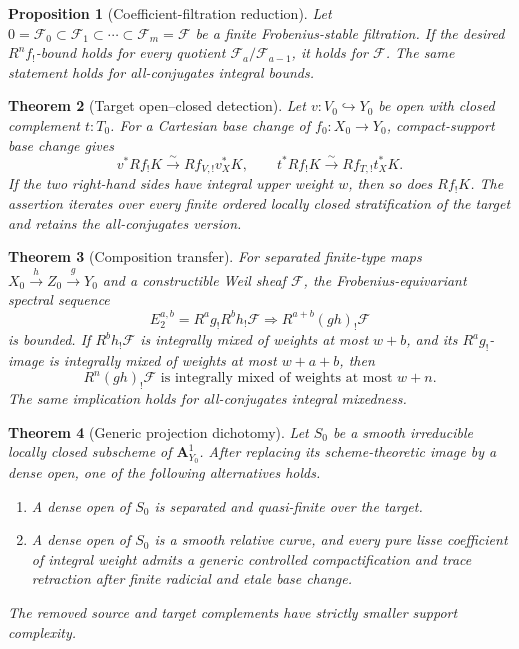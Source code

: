 \documentclass[10pt]{article}
\newtheorem{theorem}{Theorem}[section]
\newtheorem{proposition}[theorem]{Proposition}
\theoremstyle{definition}
\begin{document}
\begin{proposition}[Coefficient-filtration reduction]
Let
\(0=\mathcal F_0\subset\mathcal F_1\subset\cdots\subset
\mathcal F_m=\mathcal F\) be a finite Frobenius-stable filtration.  If the
desired \(R^nf_!\)-bound holds for every quotient
\(\mathcal F_a/\mathcal F_{a-1}\), it holds for \(\mathcal F\).  The same
statement holds for all-conjugates integral bounds.
\end{proposition}

\begin{theorem}[Target open--closed detection]
Let \(v:V_0\hookrightarrow Y_0\) be open with closed complement \(t:T_0\).
For a Cartesian base change of \(f_0:X_0\to Y_0\), compact-support base
change gives
\[
 v^*Rf_!K\xrightarrow{\sim}Rf_{V,!}v_X^*K,
 \qquad
 t^*Rf_!K\xrightarrow{\sim}Rf_{T,!}t_X^*K.
\]
If the two right-hand sides have integral upper weight \(w\), then so does
\(Rf_!K\).  The assertion iterates over every finite ordered locally closed
stratification of the target and retains the all-conjugates version.
\end{theorem}

\begin{theorem}[Composition transfer]
For separated finite-type maps
\(X_0\xrightarrow{h} Z_0\xrightarrow{g}Y_0\) and a constructible Weil sheaf
\(\mathcal F\), the Frobenius-equivariant spectral sequence
\[
 E_2^{a,b}=R^ag_!R^bh_!\mathcal F
          \Longrightarrow R^{a+b}(gh)_!\mathcal F
\]
is bounded.  If \(R^bh_!\mathcal F\) is integrally mixed of weights at most
\(w+b\), and its \(R^ag_!\)-image is integrally mixed of weights at most
\(w+a+b\), then
\[
 R^n(gh)_!\mathcal F
 \text{ is integrally mixed of weights at most }w+n.
\]
The same implication holds for all-conjugates integral mixedness.
\end{theorem}

\begin{theorem}[Generic projection dichotomy]
Let \(S_0\) be a smooth irreducible locally closed subscheme of
\(\mathbf A^1_{Y_0}\).  After replacing its scheme-theoretic image by a
dense open, one of the following alternatives holds.
\begin{enumerate}[label=\textup{\(\roman*\)}]
\item A dense open of \(S_0\) is separated and quasi-finite over the target.
\item A dense open of \(S_0\) is a smooth relative curve, and every pure
lisse coefficient of integral weight admits a generic controlled
compactification and trace retraction after finite radicial and etale base
change.
\end{enumerate}
The removed source and target complements have strictly smaller support
complexity.
\end{theorem}
\end{document}
